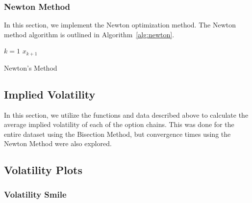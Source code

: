 \documentclass[10pt]{article}
\begin{document}
        
        
        \subsubsection{Newton Method}
        
        In this section, we implement the Newton optimization method. The Newton method algorithm is outlined in Algorithm~\ref{alg:newton}.
        
        \begin{algorithm}[h]
            \SetAlgoNoLine
            $k = 1$\;
            \Return $x_{k+1}$\;
            \caption{Newton's Method}
            \label{alg:newton}
        \end{algorithm}


    \subsection{Implied Volatility}

    In this section, we utilize the functions and data described above to calculate the average implied volatility of each of the option chains. This was done for the entire dataset using the Bisection Method, but convergence times using the Newton Method were also explored.

    \subsection{Volatility Plots}
        \subsubsection{Volatility Smile}
        
\end{document}
